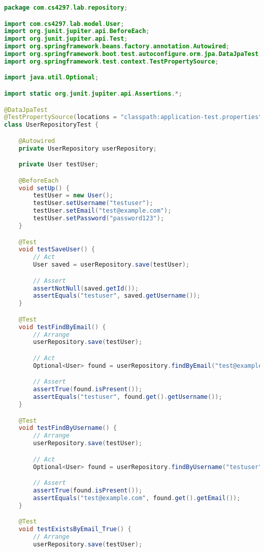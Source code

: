 \documentclass[12pt,a4paper]{article}
\begin{document}
\begin{lstlisting}[language=java, caption=UserRepositoryTest.java - Database Integration Tests]
package com.cs4297.lab.repository;

import com.cs4297.lab.model.User;
import org.junit.jupiter.api.BeforeEach;
import org.junit.jupiter.api.Test;
import org.springframework.beans.factory.annotation.Autowired;
import org.springframework.boot.test.autoconfigure.orm.jpa.DataJpaTest;
import org.springframework.test.context.TestPropertySource;

import java.util.Optional;

import static org.junit.jupiter.api.Assertions.*;

@DataJpaTest
@TestPropertySource(locations = "classpath:application-test.properties")
class UserRepositoryTest {

    @Autowired
    private UserRepository userRepository;

    private User testUser;

    @BeforeEach
    void setUp() {
        testUser = new User();
        testUser.setUsername("testuser");
        testUser.setEmail("test@example.com");
        testUser.setPassword("password123");
    }

    @Test
    void testSaveUser() {
        // Act
        User saved = userRepository.save(testUser);

        // Assert
        assertNotNull(saved.getId());
        assertEquals("testuser", saved.getUsername());
    }

    @Test
    void testFindByEmail() {
        // Arrange
        userRepository.save(testUser);

        // Act
        Optional<User> found = userRepository.findByEmail("test@example.com");

        // Assert
        assertTrue(found.isPresent());
        assertEquals("testuser", found.get().getUsername());
    }

    @Test
    void testFindByUsername() {
        // Arrange
        userRepository.save(testUser);

        // Act
        Optional<User> found = userRepository.findByUsername("testuser");

        // Assert
        assertTrue(found.isPresent());
        assertEquals("test@example.com", found.get().getEmail());
    }

    @Test
    void testExistsByEmail_True() {
        // Arrange
        userRepository.save(testUser);


\end{lstlisting}
\end{document}
